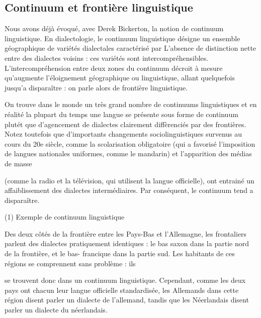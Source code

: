 \subsection{Continuum et frontière linguistique}


Nous avons déjà évoqué, avec Derek Bickerton, la notion de continuum linguistique. En dialectologie, le continuum linguistique désigne un ensemble géographique de variétés dialectales caractérisé par L’absence de distinction nette entre des dialectes voisins : ces variétés sont intercompréhensibles. L’intercompréhension entre deux zones du continuum décroit à mesure qu’augmente l’éloignement géographique ou linguistique, allant quelquefois jusqu’a disparaître : on parle alors de frontière linguistique.


On trouve dans le monde un très grand nombre de continuums linguistiques et en réalité la plupart du temps une langue se présente sous forme de continuum plutét que d’agencement de dialectes clairement diffèrenciés par des frontières. Notez toutefois que d’importants changements sociolinguistiques survenus au cours du 20e siècle, comme la scolarisation obligatoire (qui a favorisé l'imposition de langues nationales uniformes, comme le mandarin) et l’apparition des médias de masse


(comme la radio et la télévision, qui utilisent la langue officielle), ont entrainé un affaiblissement des dialectes intermédiaires. Par conséquent, le continuum tend a disparaître.


(1) Exemple de continuum linguistique


Des deux côtés de la frontière entre les Pays-Bas et l’Allemagne, les frontaliers parlent des dialectes pratiquement identiques : le bas saxon dans la partie nord de la frontière, et le bas- francique dans la partie sud. Les habitants de ces régions se comprennent sans problème : ils



se trouvent donc dans un continuum linguistique. Cependant, comme les deux pays ont chacun leur langue officielle standardisée, les Allemands dans cette région disent parler un dialecte de l’allemand, tandis que les Néerlandais disent parler un dialecte du néerlandais.



